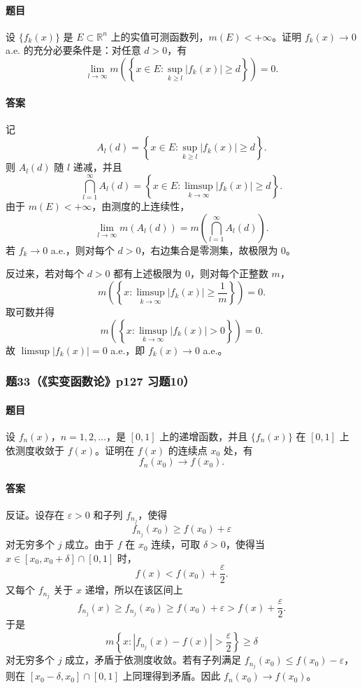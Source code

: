 \documentclass{article}
\newcommand{\R}{\mathbb{R}}
\newcommand{\eps}{\varepsilon}
\newcommand{\meas}{m}
\begin{document}
\paragraph{题目}设 $\{f_k(x)\}$ 是 $E\subset\R^n$ 上的实值可测函数列，$\meas(E)<+\infty$。证明 $f_k(x)\to0$ a.e. 的充分必要条件是：对任意 $d>0$，有
\[
\lim_{l\to\infty}\meas\left(\left\{x\in E:\sup_{k\ge l}|f_k(x)|\ge d\right\}\right)=0.
\]

\paragraph{答案}记
\[
A_l(d)=\left\{x\in E:\sup_{k\ge l}|f_k(x)|\ge d\right\}.
\]
则 $A_l(d)$ 随 $l$ 递减，并且
\[
\bigcap_{l=1}^{\infty}A_l(d)=\left\{x\in E:\limsup_{k\to\infty}|f_k(x)|\ge d\right\}.
\]
由于 $\meas(E)<+\infty$，由测度的上连续性，
\[
\lim_{l\to\infty}\meas(A_l(d))
=
\meas\left(\bigcap_{l=1}^{\infty}A_l(d)\right).
\]
若 $f_k\to0$ a.e.，则对每个 $d>0$，右边集合是零测集，故极限为 $0$。

反过来，若对每个 $d>0$ 都有上述极限为 $0$，则对每个正整数 $m$，
\[
\meas\left(\left\{x:\limsup_{k\to\infty}|f_k(x)|\ge \frac1m\right\}\right)=0.
\]
取可数并得
\[
\meas\left(\left\{x:\limsup_{k\to\infty}|f_k(x)|>0\right\}\right)=0.
\]
故 $\limsup |f_k(x)|=0$ a.e.，即 $f_k(x)\to0$ a.e.。

\subsubsection*{题33（《实变函数论》p127 习题10）}
\paragraph{题目}设 $f_n(x)$，$n=1,2,\ldots$，是 $[0,1]$ 上的递增函数，并且 $\{f_n(x)\}$ 在 $[0,1]$ 上依测度收敛于 $f(x)$。证明在 $f(x)$ 的连续点 $x_0$ 处，有
\[
f_n(x_0)\to f(x_0).
\]

\paragraph{答案}反证。设存在 $\eps>0$ 和子列 $f_{n_j}$，使得
\[
f_{n_j}(x_0)\ge f(x_0)+\eps
\]
对无穷多个 $j$ 成立。由于 $f$ 在 $x_0$ 连续，可取 $\delta>0$，使得当 $x\in[x_0,x_0+\delta]\cap[0,1]$ 时，
\[
f(x)<f(x_0)+\frac{\eps}{2}.
\]
又每个 $f_{n_j}$ 关于 $x$ 递增，所以在该区间上
\[
f_{n_j}(x)\ge f_{n_j}(x_0)
\ge f(x_0)+\eps>f(x)+\frac{\eps}{2}.
\]
于是
\[
\meas\left\{x:|f_{n_j}(x)-f(x)|>\frac{\eps}{2}\right\}\ge\delta
\]
对无穷多个 $j$ 成立，矛盾于依测度收敛。若有子列满足 $f_{n_j}(x_0)\le f(x_0)-\eps$，则在 $[x_0-\delta,x_0]\cap[0,1]$ 上同理得到矛盾。因此 $f_n(x_0)\to f(x_0)$。
\end{document}
